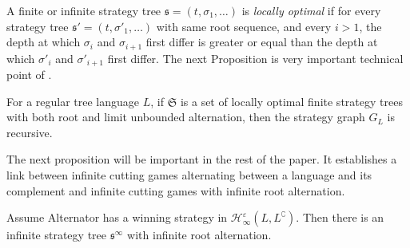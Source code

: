 A finite or infinite strategy tree $\mathfrak{s}=(t, \sigma_1, \dots)$ is \emph{locally optimal} if for every strategy tree $\mathfrak{s}'=(t, \sigma'_1, \dots)$ with same root sequence, and every $i>1$, the depth at which $\sigma_i$ and $\sigma_{i+1}$ first differ is greater or equal than the depth at which $\sigma'_i$ and $\sigma'_{i+1}$ first differ.
The next Proposition is very important technical point of \cite{bp}. 
\begin{proposition}[\cite{bp}]\label{prop:locality}
 For a regular tree language $L$, if $\mathfrak{S}$ is a set of locally optimal finite strategy trees with both root and limit unbounded alternation, then the strategy graph $G_L$ is recursive.
 \end{proposition}
The next proposition will be important in the rest of the paper. It establishes a link between infinite cutting games alternating between a language and its complement and infinite cutting games with infinite root alternation.
\begin{proposition}\label{prop:types}
 Assume Alternator has a winning strategy in  $\mathcal{H}^\varepsilon_\infty(L, L^\complement)$. Then there is an infinite strategy tree $\mathfrak{s}^\infty$ with infinite root alternation. 
\end{proposition} 

